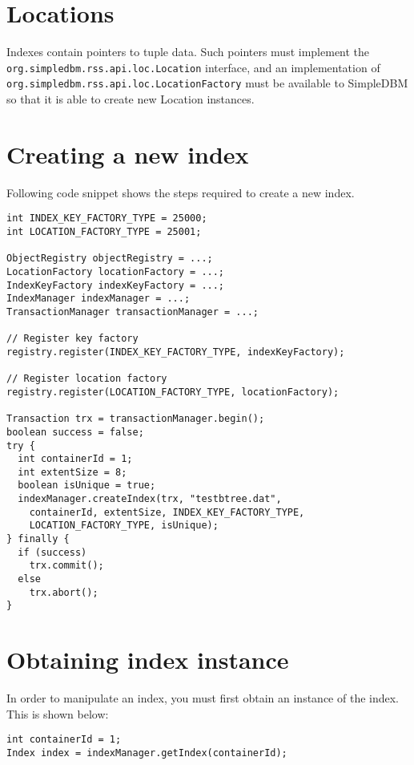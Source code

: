 \documentclass[a4paper,draft,oneside]{book}
\begin{document}
\section{Locations}

Indexes contain pointers to tuple data. Such pointers must implement the
\verb|org.simpledbm.rss.api.loc.Location| interface, and an implementation of
\verb|org.simpledbm.rss.api.loc.LocationFactory| must be available to SimpleDBM so that
it is able to create new Location instances.

\section{Creating a new index}

Following code snippet shows the steps required to create a new
index.

\begin{verbatim}
int INDEX_KEY_FACTORY_TYPE = 25000;
int LOCATION_FACTORY_TYPE = 25001;

ObjectRegistry objectRegistry = ...;
LocationFactory locationFactory = ...;
IndexKeyFactory indexKeyFactory = ...;
IndexManager indexManager = ...;
TransactionManager transactionManager = ...;

// Register key factory
registry.register(INDEX_KEY_FACTORY_TYPE, indexKeyFactory);

// Register location factory
registry.register(LOCATION_FACTORY_TYPE, locationFactory);

Transaction trx = transactionManager.begin();
boolean success = false;
try {
  int containerId = 1;
  int extentSize = 8;
  boolean isUnique = true;
  indexManager.createIndex(trx, "testbtree.dat", 
    containerId, extentSize, INDEX_KEY_FACTORY_TYPE, 
    LOCATION_FACTORY_TYPE, isUnique);
} finally {
  if (success)
    trx.commit();
  else
    trx.abort();
}
\end{verbatim}

\section{Obtaining index instance}

In order to manipulate an index, you must first obtain an instance of the
index. This is shown below:

\begin{verbatim}
int containerId = 1;
Index index = indexManager.getIndex(containerId);
\end{verbatim}
\end{document}
